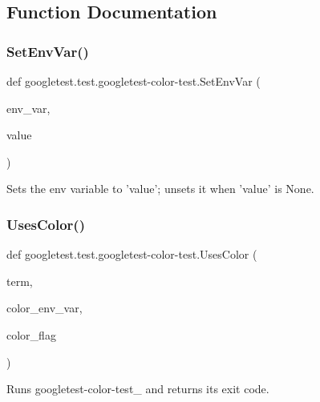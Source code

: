 \subsection{Function Documentation}
\mbox{\label{namespacegoogletest_1_1test_1_1googletest-color-test_ae62a6ab0c9dffae195d3ab9ee25a6ef0}} 
\subsubsection{\texorpdfstring{SetEnvVar()}{SetEnvVar()}}
{\footnotesize\ttfamily def googletest.\+test.\+googletest-\/color-\/test.\+Set\+Env\+Var (\begin{DoxyParamCaption}\item[{}]{env\+\_\+var,  }\item[{}]{value }\end{DoxyParamCaption})}

\begin{DoxyVerb}Sets the env variable to 'value'; unsets it when 'value' is None.\end{DoxyVerb}
 \mbox{\label{namespacegoogletest_1_1test_1_1googletest-color-test_a1f9347a704ca27f7102ab14900796ab1}} 
\subsubsection{\texorpdfstring{UsesColor()}{UsesColor()}}
{\footnotesize\ttfamily def googletest.\+test.\+googletest-\/color-\/test.\+Uses\+Color (\begin{DoxyParamCaption}\item[{}]{term,  }\item[{}]{color\+\_\+env\+\_\+var,  }\item[{}]{color\+\_\+flag }\end{DoxyParamCaption})}

\begin{DoxyVerb}Runs googletest-color-test_ and returns its exit code.\end{DoxyVerb}
 

